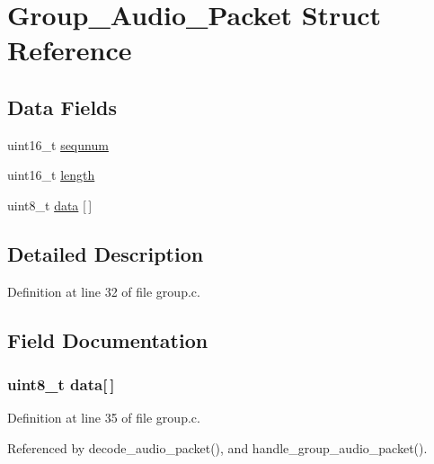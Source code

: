 \hypertarget{struct_group___audio___packet}{\section{Group\+\_\+\+Audio\+\_\+\+Packet Struct Reference}
\label{struct_group___audio___packet}
}
\subsection*{Data Fields}
\begin{DoxyCompactItemize}
\item 
uint16\+\_\+t \hyperlink{struct_group___audio___packet_afe208c7dec97b8f61e08094e61bf096e}{sequnum}
\item 
uint16\+\_\+t \hyperlink{struct_group___audio___packet_a1892eba2086d12ac2b09005aeb09ea3b}{length}
\item 
uint8\+\_\+t \hyperlink{struct_group___audio___packet_a5c239a1bb87b52b0f1d6d68c4749cd2a}{data} \mbox{[}$\,$\mbox{]}
\end{DoxyCompactItemize}


\subsection{Detailed Description}


Definition at line 32 of file group.\+c.



\subsection{Field Documentation}
\hypertarget{struct_group___audio___packet_a5c239a1bb87b52b0f1d6d68c4749cd2a}{
\subsubsection[{data}]{\setlength{\rightskip}{0pt plus 5cm}uint8\+\_\+t data\mbox{[}$\,$\mbox{]}}}\label{struct_group___audio___packet_a5c239a1bb87b52b0f1d6d68c4749cd2a}


Definition at line 35 of file group.\+c.



Referenced by decode\+\_\+audio\+\_\+packet(), and handle\+\_\+group\+\_\+audio\+\_\+packet().

